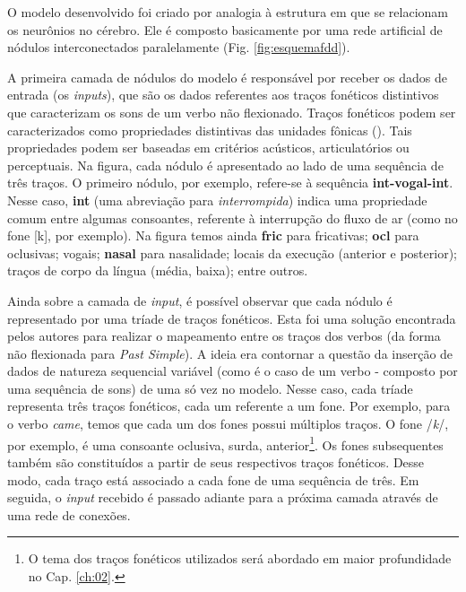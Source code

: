 


O modelo desenvolvido foi criado por analogia à estrutura em que se relacionam os neurônios no cérebro. Ele é composto basicamente por uma rede artificial de nódulos interconectados paralelamente (Fig. \ref{fig:esquemafdd}).

A primeira camada de nódulos do modelo é responsável por receber os dados de entrada (os \textit{inputs}), que são os dados referentes aos traços fonéticos distintivos que caracterizam os sons de um verbo não flexionado. Traços fonéticos podem ser caracterizados como propriedades distintivas das unidades fônicas (\cite{paraconhecer:2015}). Tais propriedades podem ser baseadas em critérios acústicos, articulatórios ou perceptuais. Na figura, cada nódulo é apresentado ao lado de uma sequência de três traços. O primeiro nódulo, por exemplo, refere-se à sequência \textbf{int-vogal-int}. Nesse caso, \textbf{int} (uma abreviação para \textit{interrompida}) indica uma propriedade comum entre algumas consoantes, referente à interrupção do fluxo de ar (como no fone [k], por exemplo). Na figura temos ainda \textbf{fric} para fricativas; \textbf{ocl} para oclusivas; vogais; \textbf{nasal} para nasalidade; locais da execução (anterior e posterior); traços de corpo da língua (média, baixa); entre outros. 

Ainda sobre a camada de \textit{input}, é possível observar que cada nódulo é representado por uma tríade de traços fonéticos. Esta foi uma solução encontrada pelos autores para realizar o mapeamento entre os traços dos verbos (da forma não flexionada para \textit{Past Simple}). A ideia era contornar a questão da inserção de dados de natureza sequencial variável (como é o caso de um verbo - composto por uma sequência de sons) de uma só vez no modelo. Nesse caso, cada tríade representa três traços fonéticos, cada um referente a um fone. Por exemplo, para o verbo \textit{came}, temos que cada um dos fones possui múltiplos traços. O fone /\textit{k}/, por exemplo, é uma consoante oclusiva, surda, anterior\footnote{O tema dos traços fonéticos utilizados será abordado em maior profundidade no Cap. \ref{ch:02}.}. Os fones subsequentes também são constituídos a partir de seus respectivos traços fonéticos. Desse modo, cada traço está associado a cada fone de uma sequência de três. Em seguida, o \textit{input} recebido é passado adiante para a próxima camada através de uma rede de conexões. 

